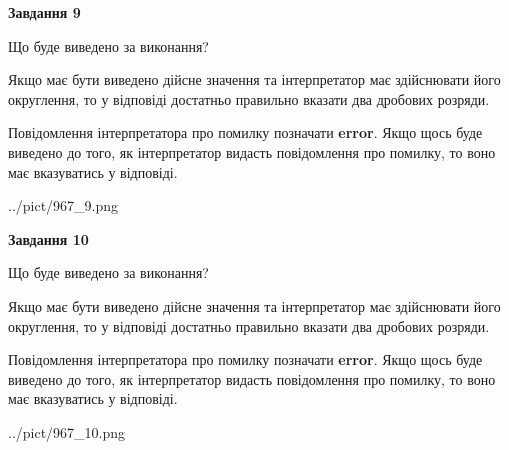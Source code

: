 \documentclass[12pt, ukrainian]{article}
\begin{document}
{\begin {Large}
{\begin {center}\textbf{Завдання 9}\end {center}}\par
Що буде виведено за виконання? \par

Якщо має бути виведено дійсне значення та інтерпретатор має здійснювати його округлення, 
то у відповіді достатньо правильно вказати два дробових розряди.

Повідомлення інтерпретатора про помилку позначати \textbf{error}.
Якщо щось буде виведено до того, як інтерпретатор видасть повідомлення про помилку, 
то воно має вказуватись у відповіді. \par

\begin{center}
	{../pict/967_9.png}
\end{center}
\newpage

{\begin {center}\textbf{Завдання 10}\end {center}}\par
Що буде виведено за виконання? \par

Якщо має бути виведено дійсне значення та інтерпретатор має здійснювати його округлення, 
то у відповіді достатньо правильно вказати два дробових розряди.

Повідомлення інтерпретатора про помилку позначати \textbf{error}.
Якщо щось буде виведено до того, як інтерпретатор видасть повідомлення про помилку, 
то воно має вказуватись у відповіді. \par

\begin{center}
	{../pict/967_10.png}
\end{center}
\newpage

\end {Large}}
\end{document}
